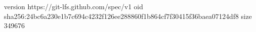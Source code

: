 version https://git-lfs.github.com/spec/v1
oid sha256:24bc6a230e1b7c694c4232f126ee288860f1b864cf7f30415f36baea07124df8
size 349676
